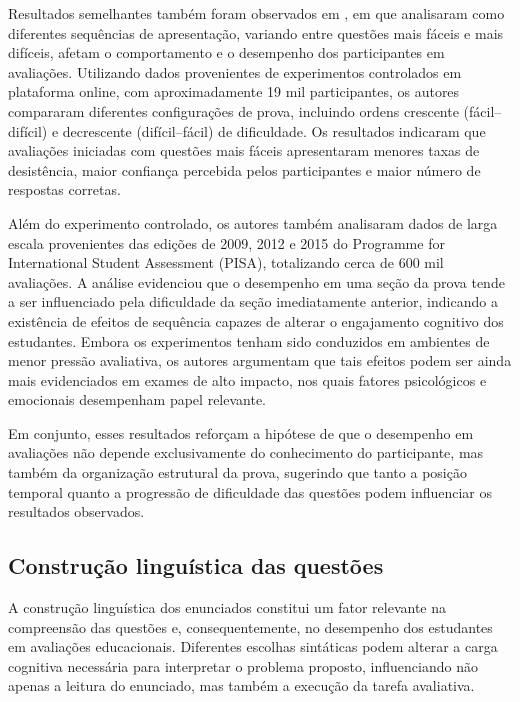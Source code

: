 \documentclass[a4paper,10pt, twocolumn]{article}
\begin{document}
Resultados semelhantes também foram observados em \textcite{Anaya2023}, em que analisaram como diferentes sequências de apresentação, variando entre questões mais fáceis e mais difíceis, afetam o comportamento e o desempenho dos participantes em avaliações. Utilizando dados provenientes de experimentos controlados em plataforma online, com aproximadamente 19 mil participantes, os autores compararam diferentes configurações de prova, incluindo ordens crescente (fácil–difícil) e decrescente (difícil–fácil) de dificuldade. Os resultados indicaram que avaliações iniciadas com questões mais fáceis apresentaram menores taxas de desistência, maior confiança percebida pelos participantes e maior número de respostas corretas.

Além do experimento controlado, os autores também analisaram dados de larga escala provenientes das edições de 2009, 2012 e 2015 do Programme for International Student Assessment (PISA), totalizando cerca de 600 mil avaliações. A análise evidenciou que o desempenho em uma seção da prova tende a ser influenciado pela dificuldade da seção imediatamente anterior, indicando a existência de efeitos de sequência capazes de alterar o engajamento cognitivo dos estudantes. Embora os experimentos tenham sido conduzidos em ambientes de menor pressão avaliativa, os autores argumentam que tais efeitos podem ser ainda mais evidenciados em exames de alto impacto, nos quais fatores psicológicos e emocionais desempenham papel relevante.

Em conjunto, esses resultados reforçam a hipótese de que o desempenho em avaliações não depende exclusivamente do conhecimento do participante, mas também da organização estrutural da prova, sugerindo que tanto a posição temporal quanto a progressão de dificuldade das questões podem influenciar os resultados observados.

\subsection{Construção linguística das questões}

A construção linguística dos enunciados constitui um fator relevante na compreensão das questões e, consequentemente, no desempenho dos estudantes em avaliações educacionais. Diferentes escolhas sintáticas podem alterar a carga cognitiva necessária para interpretar o problema proposto, influenciando não apenas a leitura do enunciado, mas também a execução da tarefa avaliativa.
\end{document}
